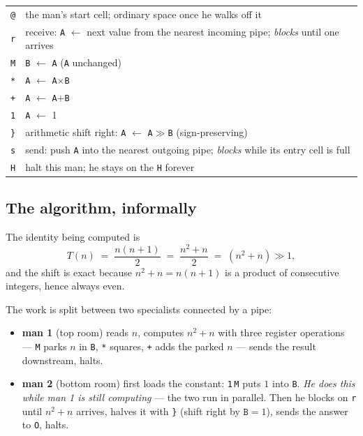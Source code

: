 \documentclass[11pt,a4paper]{article}
\newcommand{\op}[1]{\texttt{#1}}
\begin{document}
\begin{center}
\begin{tabular}{ll}
\op{@} & the man's start cell; ordinary space once he walks off it\\
\op{r} & receive: \op{A} $\leftarrow$ next value from the nearest incoming pipe; \emph{blocks} until one arrives\\
\op{M} & \op{B} $\leftarrow$ \op{A} \quad (\op{A} unchanged)\\
\op{*} & \op{A} $\leftarrow$ \op{A}$\times$\op{B}\\
\op{+} & \op{A} $\leftarrow$ \op{A}$+$\op{B}\\
\op{1} & \op{A} $\leftarrow$ 1\\
\op{\}} & arithmetic shift right: \op{A} $\leftarrow$ \op{A}$\gg$\op{B} (sign-preserving)\\
\op{s} & send: push \op{A} into the nearest outgoing pipe; \emph{blocks} while its entry cell is full\\
\op{H} & halt this man; he stays on the \op{H} forever\\
\end{tabular}
\end{center}

\subsection{The algorithm, informally}

The identity being computed is
\[
  T(n) \;=\; \frac{n(n+1)}{2} \;=\; \frac{n^2+n}{2}\;=\;(n^2+n)\gg 1 ,
\]
and the shift is exact because $n^2+n=n(n+1)$ is a product of consecutive
integers, hence always even.

The work is split between two specialists connected by a pipe:

\begin{itemize}
  \item \textbf{man 1} (top room) reads $n$, computes $n^2+n$ with three
        register operations --- \op{M} parks $n$ in \op{B}, \op{*} squares,
        \op{+} adds the parked $n$ --- sends the result downstream, halts.
  \item \textbf{man 2} (bottom room) first loads the constant:
        \op{1}\,\op{M} puts $1$ into \op{B}. \emph{He does this while man 1
        is still computing} --- the two run in parallel. Then he blocks on
        \op{r} until $n^2+n$ arrives, halves it with \op{\}} (shift right by
        $\op{B}=1$), sends the answer to \texttt{O}, halts.
\end{itemize}
\end{document}
